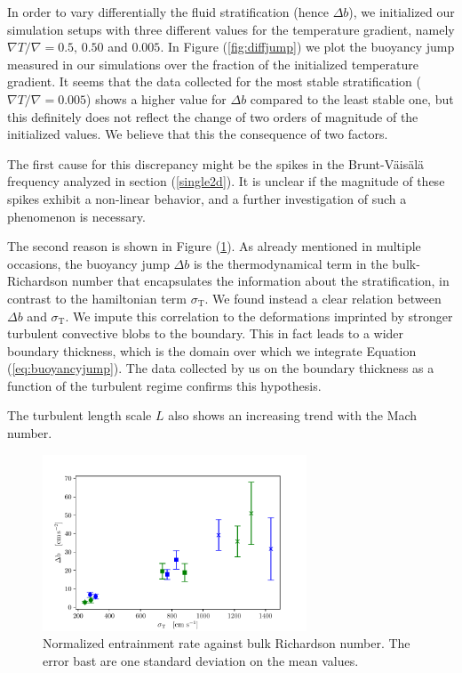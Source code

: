 In order to vary differentially the fluid stratification (hence $\Delta b$), we initialized our simulation setups with three different values for the temperature gradient, namely $\nabla T / \nabla = 0.5, \, 0.50$ and  $0.005$. In Figure (\ref{fig:diffjump}) we plot the buoyancy jump measured in our simulations over the fraction of the initialized temperature gradient. It seems that the data collected for the most stable stratification ($\nabla T / \nabla = 0.005$) shows a higher value for $\Delta b$ compared to the least stable one, but this definitely does not reflect the change of two orders of magnitude of the initialized values. We believe that this the consequence of two factors. 

The first cause for this discrepancy might be the spikes in the Brunt-Väisälä frequency analyzed in section (\ref{single2d}). It is unclear if the magnitude of these spikes exhibit a non-linear behavior, and a further investigation of such a phenomenon is necessary. 

The second reason is shown in Figure (\ref{fig:diffcorr}). As already mentioned in multiple occasions, the buoyancy jump $\Delta b$ is the thermodynamical term in the bulk-Richardson number that encapsulates the information about the stratification, in contrast to the hamiltonian term $\sigma_{\mathrm{T}}$. We found instead a clear relation between $\Delta b$ and $\sigma_{\mathrm{T}}$. We impute this correlation to the deformations imprinted by stronger turbulent convective blobs to the boundary. This in fact leads to a wider boundary thickness, which is the domain over which we integrate Equation (\ref{eq:buoyancyjump}). The data collected by us on the boundary thickness as a function of the turbulent regime confirms this hypothesis.

The turbulent length scale $L$ also shows an increasing trend with the Mach number.

\begin{figure}[t!]
\centering
\includegraphics[width=0.7\textwidth]{./img/differentialcorr.pdf}
\caption{Normalized entrainment rate against bulk Richardson number. The error bast are one standard deviation on the mean values.}
\label{fig:diffcorr}
\centering
\end{figure}


